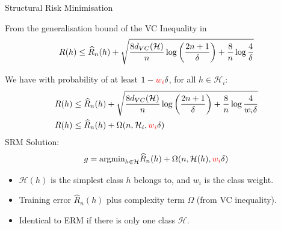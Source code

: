 \begin{definitionbox}{Structural Risk Minimisation}


From the generalisation bound of the VC Inequality in
\[R(h) \leq \widehat{R}_n(h) + \sqrt{\frac{8d_{VC}(\mathcal{H})}{n} \log\left(\frac{2n + 1}{\delta}\right) + \frac{8}{n} \log\frac{4}{\delta}}\\\]

We have with probability of at least $1-{\color{red} w_i}\delta$, for all $h \in \mathcal{H}_i$:
    \begin{align*}
R(h) &\leq \widehat{R}_n(h) + \sqrt{\frac{8d_{VC}(\mathcal{H})}{n} \log\left(\frac{2n + 1}{\delta}\right) + \frac{8}{n} \log\frac{4}{w_i\delta}}\\
R(h) &\leq \widehat{R}_n(h) + \Omega(n, \mathcal{H}_i, {\color{red} w_i}\delta)    
    \end{align*}
SRM Solution: 
    \[g = \text{argmin}_{h \in \mathcal{H}}\widehat{R}_n(h) + \Omega(n, \mathcal{H}(h), {\color{red} w_i}\delta)\]

    \begin{itemize}
        \item $\mathcal{H}(h)$ is the simplest class $h$ belongs to, and $w_i$ is the class weight.
        \item Training error $\hat{R}_n(h)$ plus complexity term $\Omega$ (from VC inequality).
        \item Identical to ERM if there is only one class $\mathcal{H}$.
    \end{itemize}

    \end{definitionbox}

